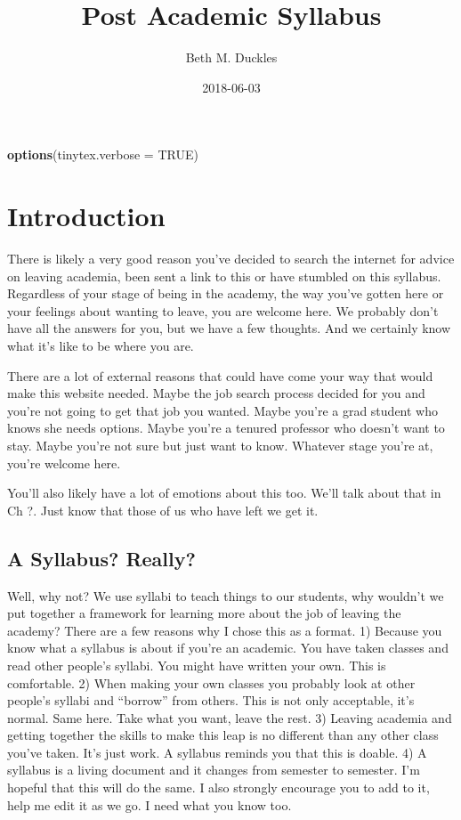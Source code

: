 \documentclass[]{book}
\title{Post Academic Syllabus}
\author{Beth M. Duckles}
\date{2018-06-03}
\newenvironment{Shaded}{\begin{snugshade}}{\end{snugshade}}
\newcommand{\KeywordTok}[1]{\textcolor[rgb]{0.13,0.29,0.53}{\textbf{#1}}}
\newcommand{\DataTypeTok}[1]{\textcolor[rgb]{0.13,0.29,0.53}{#1}}
\newcommand{\OtherTok}[1]{\textcolor[rgb]{0.56,0.35,0.01}{#1}}
\newcommand{\NormalTok}[1]{#1}
\begin{document}
\maketitle

{
\setcounter{tocdepth}{1}
\tableofcontents
}
\begin{Shaded}
\begin{Highlighting}[]
\KeywordTok{options}\NormalTok{(}\DataTypeTok{tinytex.verbose =} \OtherTok{TRUE}\NormalTok{)}
\end{Highlighting}
\end{Shaded}

\chapter{Introduction}\label{intro}

There is likely a very good reason you've decided to search the internet
for advice on leaving academia, been sent a link to this or have
stumbled on this syllabus. Regardless of your stage of being in the
academy, the way you've gotten here or your feelings about wanting to
leave, you are welcome here. We probably don't have all the answers for
you, but we have a few thoughts. And we certainly know what it's like to
be where you are.

There are a lot of external reasons that could have come your way that
would make this website needed. Maybe the job search process decided for
you and you're not going to get that job you wanted. Maybe you're a grad
student who knows she needs options. Maybe you're a tenured professor
who doesn't want to stay. Maybe you're not sure but just want to know.
Whatever stage you're at, you're welcome here.

You'll also likely have a lot of emotions about this too. We'll talk
about that in Ch ?. Just know that those of us who have left we get it.

\section{A Syllabus? Really?}\label{a-syllabus-really}

Well, why not? We use syllabi to teach things to our students, why
wouldn't we put together a framework for learning more about the job of
leaving the academy? There are a few reasons why I chose this as a
format. 1) Because you know what a syllabus is about if you're an
academic. You have taken classes and read other people's syllabi. You
might have written your own. This is comfortable. 2) When making your
own classes you probably look at other people's syllabi and ``borrow''
from others. This is not only acceptable, it's normal. Same here. Take
what you want, leave the rest. 3) Leaving academia and getting together
the skills to make this leap is no different than any other class you've
taken. It's just work. A syllabus reminds you that this is doable. 4) A
syllabus is a living document and it changes from semester to semester.
I'm hopeful that this will do the same. I also strongly encourage you to
add to it, help me edit it as we go. I need what you know too.
\end{document}
